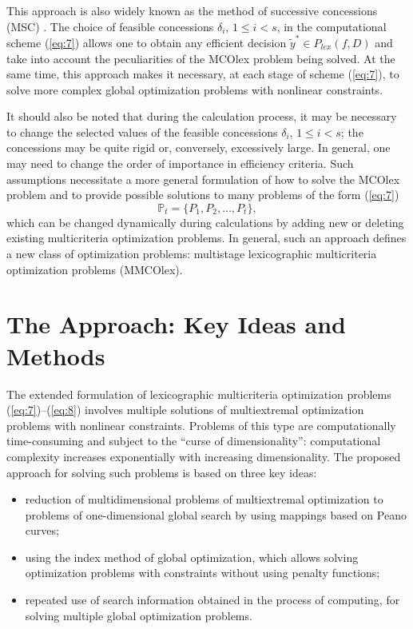 \documentclass[smallextended]{svjour3}       %
\begin{document}
This approach is also widely known as the method of successive concessions (MSC) \cite{c3,c4,c5}. The choice of feasible concessions $\delta_i$, $1 \leq i < s$, in the computational scheme (\ref{eq:7}) allows one to obtain any efficient decision $\widetilde{y}^* \in P_{lex}(f,D)$ and take into account the peculiarities of the MCOlex problem being solved. At the same time, this approach makes it necessary, at each stage of scheme (\ref{eq:7}), to solve more complex global optimization problems with nonlinear constraints.

It should also be noted that during the calculation process, it may be necessary to change the selected values of the feasible concessions $\delta_i$, $1 \leq i < s$; the concessions may be quite rigid or, conversely, excessively large. In general, one may need to change the order of importance in efficiency criteria. Such assumptions necessitate a more general formulation of how to solve the MCOlex problem and to provide possible solutions to many problems of the form (\ref{eq:7})
\begin{equation}\label{eq:8}
\mathbb{P}_t=\{ P_1,P_2,\dots,P_t\},
\end{equation}
which can be changed dynamically during calculations by adding new or deleting existing multicriteria optimization problems. In general, such an approach defines a new class of optimization problems: multistage lexicographic multicriteria optimization problems (MMCOlex).

\section{The Approach: Key Ideas and Methods}
\label{sec:3}

The extended formulation of lexicographic multicriteria optimization problems (\ref{eq:7})--(\ref{eq:8}) involves multiple solutions of multiextremal optimization problems with nonlinear constraints. Problems of this type are computationally time-consuming and subject to the ``curse of dimensionality'': computational complexity increases exponentially with increasing dimensionality. The proposed approach for solving such problems is based on three key ideas:
\begin{itemize}
  \item reduction of multidimensional problems of multiextremal optimization to problems of one-dimensional global search by using mappings based on Peano curves;
  \item using the index method of global optimization, which allows solving optimization problems with constraints without using penalty functions;
  \item repeated use of search information obtained in the process of computing, for solving multiple global optimization problems.
\end{itemize}
\end{document}
